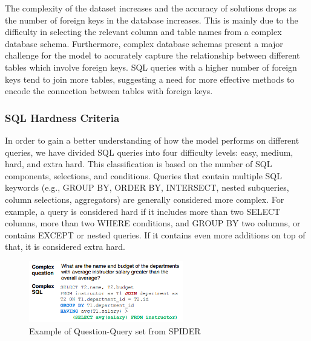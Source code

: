 The complexity of the dataset increases and the accuracy of solutions drops as the number of foreign keys in the database increases. This is mainly due to the difficulty in selecting the relevant column and table names from a complex database schema. Furthermore, complex database schemas present a major challenge for the model to accurately capture the relationship between different tables which involve foreign keys. SQL queries with a higher number of foreign keys tend to join more tables, suggesting a need for more effective methods to encode the connection between tables with foreign keys.

\subsubsection*{SQL Hardness Criteria}

In order to gain a better understanding of how the model performs on different queries, we have divided SQL queries into four difficulty levels: easy, medium, hard, and extra hard. This classification is based on the number of SQL components, selections, and conditions. Queries that contain multiple SQL keywords (e.g., GROUP BY, ORDER BY, INTERSECT, nested subqueries, column selections, aggregators) are generally considered more complex. For example, a query is considered hard if it includes more than two SELECT columns, more than two WHERE conditions, and GROUP BY two columns, or contains EXCEPT or nested queries. If it contains even more additions on top of that, it is considered extra hard.

\begin{figure}[htb]
  \centering
  \includegraphics[width=0.6\textwidth]{pics/db/Spider2.png}
  \caption{Example of Question-Query set from SPIDER\cite{yu_spider_2019}}
  \label{fig:Spider2}
\end{figure}




